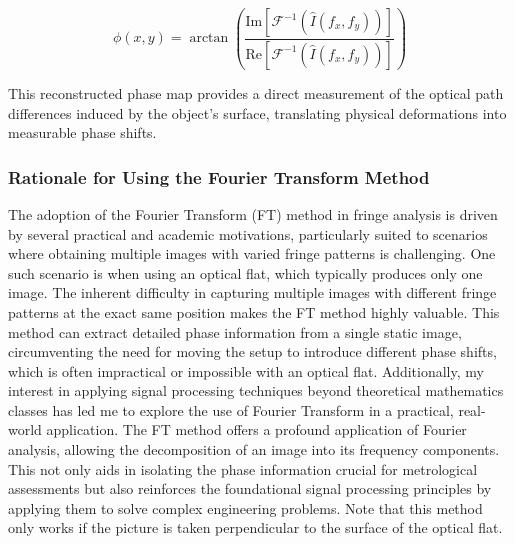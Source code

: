 \documentclass[../main.tex]{subfiles}
\begin{document}
\begin{minipage}{\textwidth}
\begin{equation}
    \phi(x, y) = \arctan\left(\frac{\text{Im}[\mathcal{F}^{-1}(\hat{I}(f_x, f_y))]}{\text{Re}[\mathcal{F}^{-1}(\hat{I}(f_x, f_y))]}\right)
\end{equation}

This reconstructed phase map provides a direct measurement of the optical path differences induced by the object's surface, translating physical deformations into measurable phase shifts.

\subsubsection{Rationale for Using the Fourier Transform Method}
The adoption of the Fourier Transform (FT) method in fringe analysis is driven by several practical and academic motivations, particularly suited to scenarios where obtaining multiple images with varied fringe patterns is challenging. One such scenario is when using an optical flat, which typically produces only one image. The inherent difficulty in capturing multiple images with different fringe patterns at the exact same position makes the FT method highly valuable. This method can extract detailed phase information from a single static image, circumventing the need for moving the setup to introduce different phase shifts, which is often impractical or impossible with an optical flat.
\newline
Additionally, my interest in applying signal processing techniques beyond theoretical mathematics classes has led me to explore the use of Fourier Transform in a practical, real-world application. The FT method offers a profound application of Fourier analysis, allowing the decomposition of an image into its frequency components. This not only aids in isolating the phase information crucial for metrological assessments but also reinforces the foundational signal processing principles by applying them to solve complex engineering problems.
\newline
Note that this method only works if the picture is taken perpendicular to the surface of the optical flat. 
\vspace{8pt}
\end{minipage}
\end{document}
